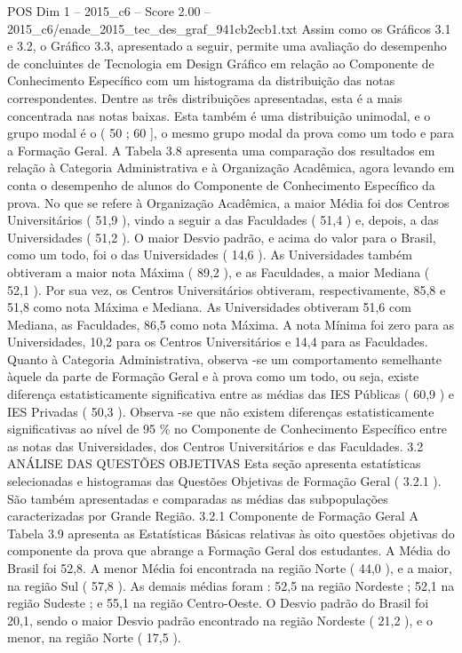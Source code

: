 \begin{textsample}{POS Dim 1 – 2015\_c6 – Score 2.00 – 2015\_c6/enade\_2015\_tec\_des\_graf\_941cb2ecb1.txt}
Assim como os Gráficos 3.1 e 3.2, o Gráfico 3.3, apresentado a seguir, permite uma avaliação do desempenho de concluintes de Tecnologia em Design Gráfico em relação ao Componente de Conhecimento Específico com um histograma da distribuição das notas correspondentes.
Dentre as três distribuições apresentadas, esta é a mais concentrada nas notas baixas.
Esta também é uma distribuição unimodal, e o grupo modal é o ( 50 ; 60 ], o mesmo grupo modal da prova como um todo e para a Formação Geral.
A Tabela 3.8 apresenta uma comparação dos resultados em relação à Categoria Administrativa e à Organização Acadêmica, agora levando em conta o desempenho de alunos do Componente de Conhecimento Específico da prova.
No que se refere à Organização Acadêmica, a maior Média foi dos Centros Universitários ( 51,9 ), vindo a seguir a das Faculdades ( 51,4 ) e, depois, a das Universidades ( 51,2 ).
O maior Desvio padrão, e acima do valor para o Brasil, como um todo, foi o das Universidades ( 14,6 ).
As Universidades também obtiveram a maior nota Máxima ( 89,2 ), e as Faculdades, a maior Mediana ( 52,1 ).
Por sua vez, os Centros Universitários obtiveram, respectivamente, 85,8 e 51,8 como nota Máxima e Mediana.
As Universidades obtiveram 51,6 com Mediana, as Faculdades, 86,5 como nota Máxima.
A nota Mínima foi zero para as Universidades, 10,2 para os Centros Universitários e 14,4 para as Faculdades.
Quanto à Categoria Administrativa, observa -se um comportamento semelhante àquele da parte de Formação Geral e à prova como um todo, ou seja, existe diferença estatisticamente significativa entre as médias das IES Públicas ( 60,9 ) e IES Privadas ( 50,3 ).
Observa -se que não existem diferenças estatisticamente significativas ao nível de 95 \% no Componente de Conhecimento Específico entre as notas das Universidades, dos Centros Universitários e das Faculdades. 3.2 ANÁLISE DAS QUESTÕES OBJETIVAS Esta seção apresenta estatísticas selecionadas e histogramas das Questões Objetivas de Formação Geral ( 3.2.1 ).
São também apresentadas e comparadas as médias das subpopulações caracterizadas por Grande Região. 3.2.1 Componente de Formação Geral A Tabela 3.9 apresenta as Estatísticas Básicas relativas às oito questões objetivas do componente da prova que abrange a Formação Geral dos estudantes.
A Média do Brasil foi 52,8.
A menor Média foi encontrada na região Norte ( 44,0 ), e a maior, na região Sul ( 57,8 ).
As demais médias foram : 52,5 na região Nordeste ; 52,1 na região Sudeste ; e 55,1 na região Centro-Oeste.
O Desvio padrão do Brasil foi 20,1, sendo o maior Desvio padrão encontrado na região Nordeste ( 21,2 ), e o menor, na região Norte ( 17,5 ).

\end{textsample}

